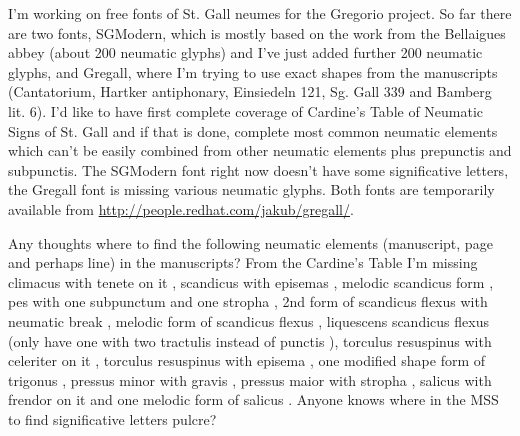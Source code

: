 \documentclass[a4paper]{article}
\begin{document}
I'm working on free fonts of St. Gall neumes for the Gregorio project.
So far there are two fonts, SGModern, which is mostly based on the work
from the Bellaigues abbey (about 200 neumatic glyphs) and I've just added
further 200 neumatic glyphs, and Gregall, where I'm trying to use exact
shapes from the manuscripts (Cantatorium, Hartker antiphonary, Einsiedeln
121, Sg. Gall 339 and Bamberg lit. 6).  I'd like to have first complete
coverage of Cardine's Table of Neumatic Signs of St. Gall and if that is
done, complete most common neumatic elements which can't be easily combined
from other neumatic elements plus prepunctis and subpunctis.
The SGModern font right now doesn't have some significative letters, the
Gregall font is missing various neumatic glyphs.
Both fonts are temporarily available from
\url{http://people.redhat.com/jakub/gregall/}.

Any thoughts where to find the following neumatic
elements (manuscript, page and perhaps line) in the manuscripts?  From the Cardine's Table
I'm missing climacus with tenete on it
{}\quad, scandicus with episemas
\quad, melodic scandicus form \quad,
pes with one subpunctum and one stropha \quad,
2nd form of scandicus flexus with neumatic break \quad,
melodic form of scandicus flexus \quad, liquescens scandicus
flexus \quad (only have one with two tractulis instead of punctis
\quad), torculus resuspinus with celeriter on it
{}\quad, torculus resuspinus with
episema \quad, one modified shape form of trigonus
\quad, pressus minor with gravis
\quad, pressus maior with stropha \quad, salicus with
frendor on it {}\quad and
one melodic form of salicus \quad.  Anyone knows where in the MSS
to find significative letters {\color{red}pulcre}?
\end{document}
